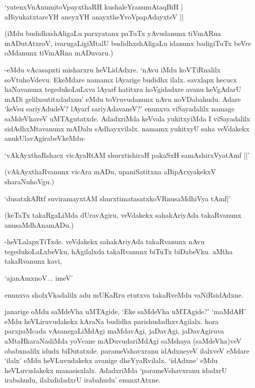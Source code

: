 \begin{shloka}
`yatenxVnAnumitoV\s payxthaRH kushaleYranumAtaqBiH |\\
aBiyukatxtareYH aneyxYH anayxtheYvoVpapAdayxteV ||
\end{shloka}

(iMdu budidhxshAligaLu parxyatanx paTuTx yAvudanunx tiVmARna mADutAtxroV, ivarugaLigiMtalU budidhxshAligaLu idanunx badigiTuTx beVre oMdanunx tiVmARna mADuvaru.)

-eMdu vAcasapxti misharxru heVLidAdxre. `nAvu iMdu koVTiRnalilx soVtuhoVdevu. EkeMdare namamx lAyarige budidhx ilalx. savxlapx hecucx haNavanunx tegedukoLuLxva lAyarf hatitxra hoVgidadxre avanu heVgAdarU mADi gelilxsutitxdadxnu' eMdu toVruvudanunx nAvu noVDabahudu. Adare `keVsu sariyAdudeV? lAyarf sariyAdavaneV?' enunxva viSayadalilx namage saMdeVhaveV uMTAgutatxde. AdadxriMda keVvala yukitxyiMda I viSayadalilx sidAdhxMtavanunx mADalu sAdhayxvilalx. namamx yukitxyU saha veVdakekx anukUlavAgirabeVkeMdu-

\begin{shloka}
`vAkAyxthaRshacx vicAyaRtAM shurxtishiraH pakaSxH samAshirxVyatAmf ||'
\end{shloka}

(vAkAyxthaRvanunx vicAra mADu, upaniSatitxna aBipArxyakekxV sharaNuhoVgu.)

\begin{shloka}
`dusatxkARtf suviramayxtAM shurxtimatasatxkoVR\s nusaMdhiVya tAmf|'
\end{shloka}

(keTaTx takaRgaLiMda dUravAgiru, veVdakekx sahakAriyAda takaRvanunx anusaMdhAnamADu.)

-heVLalapxTiTxde. veVdakekx sahakAriyAda takaRvanunx nAvu tegedukoLaLxbeVku, hAgilalxda takaRvanunx biTuTx biDabeVku. aMtha takaRvanunx kavi,

\begin{shloka}
`ajanAmxnoV$\ldots$ imeV'
\end{shloka}

enunxva sholxVkadalilx adu mUKaRru etutxva takaRveMdu vaNiRsidAdxne.

janarige oMdu saMdeVha uMTAgide, `Eke saMdeVha uMTAgide?' `maMdAH' eMdu heVLiruvudakekx kAraNa budidhx parishudadhxvAgilalx. hora parxpaMcada vAsanegaLiMdAgi maMdavAgi, jaDavAgi, jaDavAgiruva aMtaHkaraNadiMda yoVcane mADuvudariMdAgi saMshaya (saMdeVha)veV obabxnalilx idudx biDutatxde. parameVshavxranu idAdxneyeV ilalxveV eMdare `ilalx' eMdu heVLuvudakekx avanige dheYyaRvilalx. `idAdxne' eMdu heVLuvudakekx manasisxlalx. AdadxriMda `parameVshavxranu idadxrU irabahudu, ilalxdidadxrU irabahudu' enunxtAtxne.


